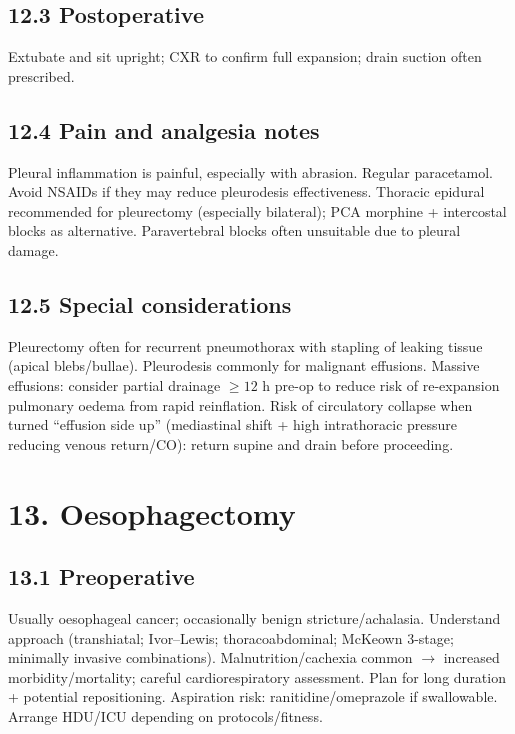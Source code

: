 \documentclass[11pt,a4paper]{article}
\begin{document}
\subsection{12.3 Postoperative}
Extubate and sit upright; CXR to confirm full expansion; drain suction often prescribed.

\subsection{12.4 Pain and analgesia notes}
Pleural inflammation is painful, especially with abrasion. Regular paracetamol. Avoid NSAIDs if they may reduce pleurodesis effectiveness. Thoracic epidural recommended for pleurectomy (especially bilateral); PCA morphine + intercostal blocks as alternative. Paravertebral blocks often unsuitable due to pleural damage.

\subsection{12.5 Special considerations}
Pleurectomy often for recurrent pneumothorax with stapling of leaking tissue (apical blebs/bullae). Pleurodesis commonly for malignant effusions. Massive effusions: consider partial drainage \(\geq 12\) h pre-op to reduce risk of re-expansion pulmonary oedema from rapid reinflation. Risk of circulatory collapse when turned ``effusion side up'' (mediastinal shift + high intrathoracic pressure reducing venous return/CO): return supine and drain before proceeding.

\section{13. Oesophagectomy}

\subsection{13.1 Preoperative}
Usually oesophageal cancer; occasionally benign stricture/achalasia. Understand approach (transhiatal; Ivor--Lewis; thoracoabdominal; McKeown 3-stage; minimally invasive combinations). Malnutrition/cachexia common \(\rightarrow\) increased morbidity/mortality; careful cardiorespiratory assessment. Plan for long duration + potential repositioning. Aspiration risk: ranitidine/omeprazole if swallowable. Arrange HDU/ICU depending on protocols/fitness.
\end{document}
